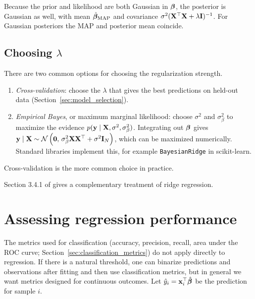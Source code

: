 Because the prior and likelihood are both Gaussian in $\boldsymbol{\beta}$, the posterior is Gaussian as well, with mean $\hat{\boldsymbol{\beta}}_{\text{MAP}}$ and covariance $\sigma^2(\mathbf{X}^\top\mathbf{X}+\lambda\mathbf{I})^{-1}$. For Gaussian posteriors the MAP and posterior mean coincide.

\subsection{\texorpdfstring{Choosing $\lambda$}{Choosing lambda}}

There are two common options for choosing the regularization strength.
\begin{enumerate}
  \item \emph{Cross-validation}: choose the $\lambda$ that gives the best predictions on held-out data (Section~\ref{sec:model_selection}).
  \item \emph{Empirical Bayes}, or maximum marginal likelihood: choose $\sigma^2$ and $\sigma^2_\beta$ to maximize the evidence $p(\mathbf{y}\mid\mathbf{X},\sigma^2,\sigma_\beta^2)$. Integrating out $\boldsymbol{\beta}$ gives $\mathbf{y}\mid\mathbf{X}\sim\mathcal{N}\left(\mathbf{0},\,\sigma_\beta^2\mathbf{X}\mathbf{X}^\top+\sigma^2\mathbf{I}_N\right)$, which can be maximized numerically. Standard libraries implement this, for example \texttt{BayesianRidge} in scikit-learn.
\end{enumerate}
Cross-validation is the more common choice in practice.

Section 3.4.1 of \citet{esl} gives a complementary treatment of ridge regression.

\section{Assessing regression performance}
\label{sec:regression_metrics}

The metrics used for classification (accuracy, precision, recall, area under the ROC curve; Section~\ref{sec:classification_metrics}) do not apply directly to regression. If there is a natural threshold, one can binarize predictions and observations after fitting and then use classification metrics, but in general we want metrics designed for continuous outcomes. Let $\hat y_i=\mathbf{x}_i^\top\hat{\boldsymbol{\beta}}$ be the prediction for sample $i$.

